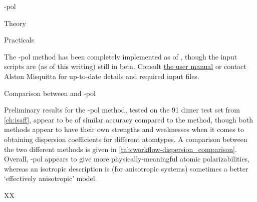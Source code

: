 \begin{subsubsection}{\isa-pol}
\begin{paragraph}{Theory}
\end{paragraph}
\begin{paragraph}{Practicals}

The \isa-pol method has been completely implemented as of , though
the input scripts are (as of this writing) still in beta. Consult 
\href{http://www-stone.ch.cam.ac.uk/programs/camcasp.html}{the \camcasp user
manual} or contact Alston Misquitta for up-to-date details and required input files.

\end{paragraph}

\end{subsubsection}
\begin{subsubsection}{Comparison between \idma and \isa-pol}
\label{sec:workflow-dispersion_comparison}


Preliminary results for the \isa-pol method, tested on the 91 dimer test set
from \cref{ch:isaff},
appear to be of similar accuracy compared to the \idma method, though both
methods appear to have their own strengths and weaknesses when it comes to
obtaining dispersion coefficients for different atomtypes. A comparison
between the two different methods is given in
\cref{tab:workflow-dispersion_comparison}. Overall, \isa-pol appears to give
more physically-meaningful atomic polarizabilities, whereas an isotropic \idma
description is (for
anisotropic systems) sometimes a better `effectively anisotropic'
model.\footnotemark{ }


\begin{table}
\centering
\begin{tabu}{XX}


\end{tabu}
\end{table}
\end{subsubsection}
